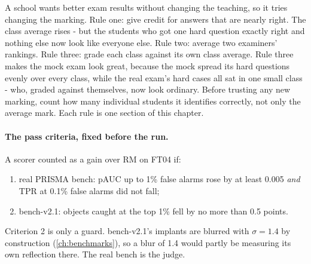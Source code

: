 \begin{analogy}
A school wants better exam results without changing the teaching, so it tries changing the marking. Rule one: give credit
for answers that are nearly right. The class average rises - but the students who got one hard question exactly right and
nothing else now look like everyone else. Rule two: average two examiners' rankings. Rule three: grade each class against
its own class average. Rule three makes the mock exam look great, because the mock spread its hard questions evenly over
every class, while the real exam's hard cases all sat in one small class - who, graded against themselves, now look
ordinary. Before trusting any new marking, count how many individual students it identifies correctly, not only the
average mark. Each rule is one section of this chapter.
\end{analogy}

\paragraph{The pass criteria, fixed before the run.} A scorer counted as a gain over RM on FT04 if:
\begin{enumerate}
\item real PRISMA bench: pAUC up to 1\% false alarms rose by at least 0.005 \emph{and} TPR at 0.1\% false alarms did not
  fall;
\item bench-v2.1: objects caught at the top 1\% fell by no more than 0.5 points.
\end{enumerate}
Criterion 2 is only a guard. bench-v2.1's implants are blurred with $\sigma = 1.4$ by construction (\cref{ch:benchmarks}),
so a blur of 1.4 would partly be measuring its own reflection there. The real bench is the judge.

